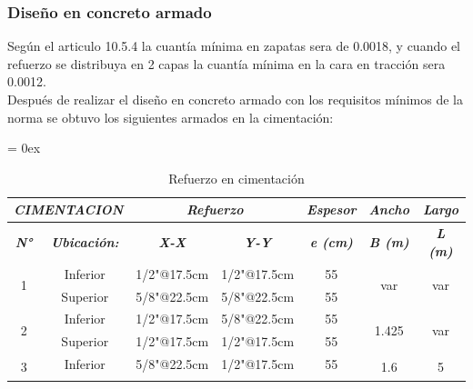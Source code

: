 \documentclass{article}%
\begin{document}
\subsubsection{Diseño en concreto armado}
\noindent 
Según el articulo 10.5.4 la cuantía mínima en zapatas sera de 0.0018, y cuando el refuerzo se distribuya en 2 capas la cuantía mínima en la cara en tracción sera 0.0012.\\
Después de realizar el diseño en concreto armado con los requisitos mínimos de la norma se obtuvo los siguientes armados en la cimentación:
\begin{table}[h!]
\caption{Refuerzo en cimentación}
{
\extrarowheight = 0ex
\renewcommand{\arraystretch}{1.2}
\begin{tabular}{|cc|cc|c|c|c|}
\hline
\multicolumn{2}{|c|}{\textit{\textbf{CIMENTACION}}}                       & \multicolumn{2}{c|}{\textit{\textbf{Refuerzo}}}                    & \textit{\textbf{Espesor}} & \textit{\textbf{Ancho}} & \textit{\textbf{Largo}} \\ \hline
\multicolumn{1}{|c|}{\textit{\textbf{N°}}} & \textit{\textbf{Ubicación:}} & \multicolumn{1}{c|}{\textit{\textbf{X-X}}} & \textit{\textbf{Y-Y}} & \textit{\textbf{e (cm)}}  & \textit{\textbf{B (m)}} & \textit{\textbf{L (m)}} \\ \hline
\multicolumn{1}{|c|}{\multirow{2}{*}{1}}   & Inferior                     & \multicolumn{1}{c|}{1/2"@17.5cm}           & 1/2"@17.5cm           & 55                        & \multirow{2}{*}{var}    & \multirow{2}{*}{var}    \\ \cline{2-5}
\multicolumn{1}{|c|}{}                     & Superior                     & \multicolumn{1}{c|}{5/8"@22.5cm}           & 5/8"@22.5cm           & 55                        &                         &                         \\ \hline
\multicolumn{1}{|c|}{\multirow{2}{*}{2}}   & Inferior                     & \multicolumn{1}{c|}{1/2"@17.5cm}           & 5/8"@22.5cm           & 55                        & \multirow{2}{*}{1.425}  & \multirow{2}{*}{var}    \\ \cline{2-5}
\multicolumn{1}{|c|}{}                     & Superior                     & \multicolumn{1}{c|}{1/2"@17.5cm}           & 1/2"@17.5cm           & 55                        &                         &                         \\ \hline
\multicolumn{1}{|c|}{\multirow{2}{*}{3}}   & Inferior                     & \multicolumn{1}{c|}{5/8"@22.5cm}           & 1/2"@17.5cm           & 55                        & \multirow{2}{*}{1.6}    & \multirow{2}{*}{5}      \\ \cline{2-5}

\end{tabular}}
\end{table}
\end{document}
